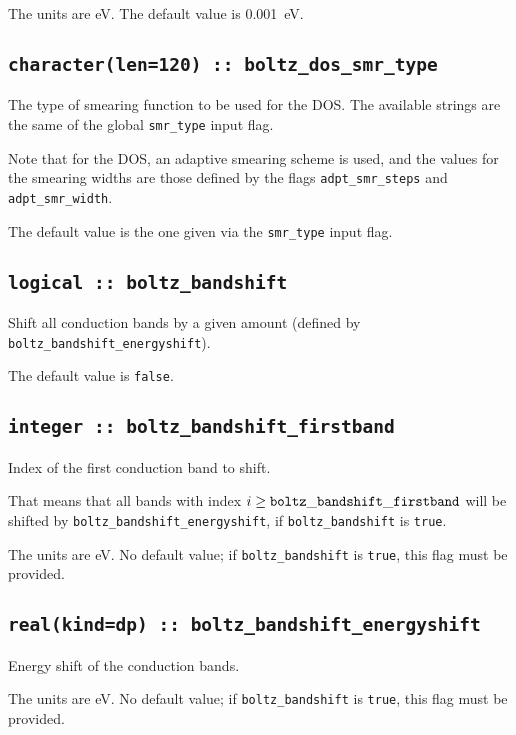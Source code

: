 The units are eV.
The default value is 0.001~eV.

\subsection[boltz\_dos\_smr\_type]{\tt character(len=120) :: boltz\_dos\_smr\_type}
The type of smearing function to be used for the DOS. The available strings are the same of the global {\tt smr\_type} input flag. 

Note that for the DOS, an adaptive smearing scheme is used, and the values for the smearing widths are those defined by the flags {\tt adpt\_smr\_steps} and {\tt adpt\_smr\_width}.

The default value is the one given via the {\tt smr\_type} input flag. 

\subsection[boltz\_bandshift]{\tt logical :: boltz\_bandshift}
Shift all conduction bands by a given amount (defined by {\tt boltz\_bandshift\_energyshift}).

The default value is \verb#false#.

\subsection[boltz\_bandshift\_firstband]{\tt integer :: boltz\_bandshift\_firstband}
Index of the first conduction band to shift.

That means that all bands with index $i\ge {\tt boltz\_bandshift\_firstband}$ will be shifted by  {\tt boltz\_bandshift\_energyshift}, if {\tt boltz\_bandshift} is \verb#true#.

The units are eV.
No default value; if {\tt boltz\_bandshift} is \verb#true#, this flag must be provided.

\subsection[boltz\_bandshift\_energyshift]{\tt real(kind=dp) :: boltz\_bandshift\_energyshift}
Energy shift of the conduction bands.

The units are eV.
No default value; if {\tt boltz\_bandshift} is \verb#true#, this flag must be provided.



